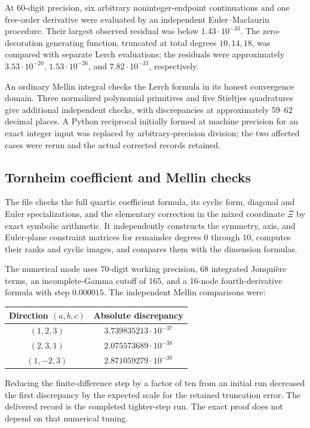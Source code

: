 \documentclass[11pt,a4paper]{article}
\numberwithin{equation}{section}
\theoremstyle{definition}
\theoremstyle{remark}
\newcommand{\src}[1]{\texttt{\detokenize{#1}}}
\begin{document}
At 60-digit precision, six arbitrary noninteger-endpoint
continuations and one free-order derivative were evaluated by
an independent Euler--Maclaurin procedure. Their largest
observed residual was below $1.43\cdot10^{-33}$.
The zero-decoration generating function, truncated at total
degrees $10,14,18$, was compared with separate Lerch evaluations;
the residuals were approximately
$3.53\cdot10^{-20}$, $1.53\cdot10^{-26}$, and
$7.82\cdot10^{-33}$, respectively.

An ordinary Mellin integral checks the Lerch formula in its
honest convergence domain. Three normalized polynomial
primitives and five Stieltjes quadratures give additional
independent checks, with discrepancies at approximately
59--62 decimal places. A Python reciprocal initially formed
at machine precision for an exact integer input was replaced
by arbitrary-precision division; the two affected cases were
rerun and the actual corrected records retained.

\subsection{Tornheim coefficient and Mellin checks}

The file \src{code/check_quartic_tornheim.py} checks the full
quartic coefficient formula, its cyclic form, diagonal and
Euler specializations, and the elementary correction in
the mixed coordinate $\Xi$ by exact symbolic arithmetic.
It independently constructs the symmetry, axis, and
Euler-plane constraint matrices for remainder degrees
$0$ through $10$, computes their ranks and cyclic images,
and compares them with the dimension formulas.

The numerical mode uses 70-digit working precision, 68
integrated Jonqui\`ere terms, an incomplete-Gamma cutoff
of 165, and a 16-node fourth-derivative formula with step
$0.000015$. The independent Mellin comparisons were:
\begin{center}
\begin{tabular}{@{}cc@{}}
\toprule
Direction $(a,b,c)$ & Absolute discrepancy\\
\midrule
$(1,2,3)$  & $3.739835213\cdot10^{-37}$\\
$(2,3,1)$  & $2.075573689\cdot10^{-38}$\\
$(1,-2,3)$ & $2.871059279\cdot10^{-39}$\\
\bottomrule
\end{tabular}
\end{center}
Reducing the finite-difference step by a factor of ten
from an initial run decreased the first discrepancy by
the expected scale for the retained truncation error.
The delivered record is the completed tighter-step run.
The exact proof does not depend on that numerical tuning.
\end{document}
